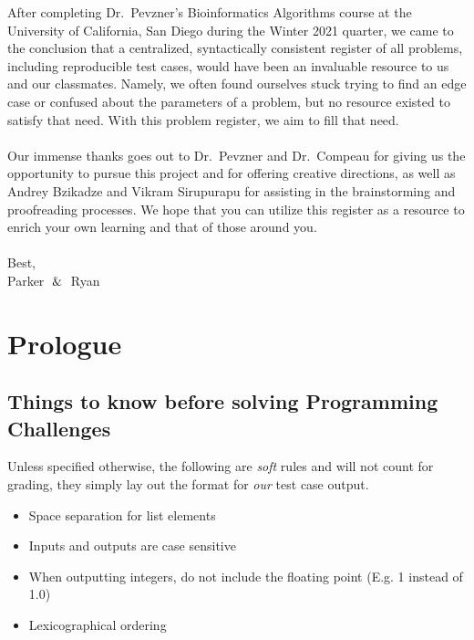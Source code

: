 \documentclass{article}
\begin{document}
\noindent After completing Dr.~Pevzner's Bioinformatics Algorithms course at the University of California, San Diego during the Winter 2021 quarter, we came to the conclusion that a centralized, syntactically consistent register of all problems, including reproducible test cases, would have been an invaluable resource to us and our classmates. Namely, we often found ourselves stuck trying to find an edge case or confused about the parameters of a problem, but no resource existed to satisfy that need. With this problem register, we aim to fill that need.
\\
\\
Our immense thanks goes out to Dr.~Pevzner and Dr.~Compeau for giving us the opportunity to pursue this project and for offering creative directions, as well as Andrey Bzikadze and Vikram Sirupurapu for assisting in the brainstorming and proofreading processes. We hope that you can utilize this register as a resource to enrich your own learning and that of those around you. \\ \\
\noindent Best, \\
\noindent Parker $\And$ Ryan

\pagebreak

\section*{Prologue}
\subsection*{Things to know before solving Programming Challenges}
\hline\vspace{5}
\noindent Unless specified otherwise, the following are \emph{soft} rules and will not count for grading, they simply lay out the format for \emph{our} test case output.
\begin{itemize}
    \item Space separation for list elements
    \item Inputs and outputs are case sensitive
    \item When outputting integers, do not include the floating point (E.g. 1 instead of 1.0)
    \item Lexicographical ordering
\end{itemize}
\end{document}
